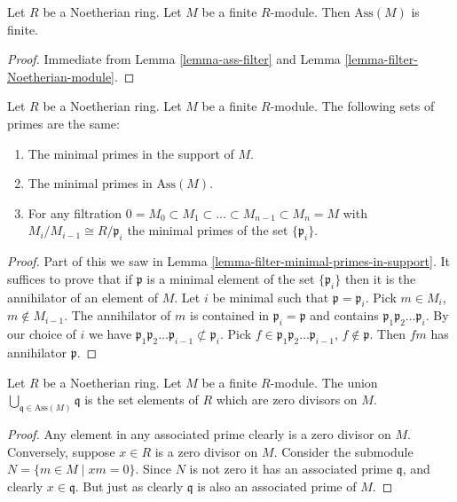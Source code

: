 \begin{lemma}
\label{lemma-finite-ass}
Let $R$ be a Noetherian ring.
Let $M$ be a finite $R$-module.
Then $\text{Ass}(M)$ is finite.
\end{lemma}

\begin{proof}
Immediate from Lemma \ref{lemma-ass-filter} and
Lemma \ref{lemma-filter-Noetherian-module}.
\end{proof}

\begin{proposition}
Let $R$ be a Noetherian ring.
Let $M$ be a finite $R$-module.
The following sets of primes are the same:
\begin{enumerate}
\item The minimal primes in the support of $M$.
\item The minimal primes in $\text{Ass}(M)$.
\item For any filtration $0 = M_0 \subset M_1 \subset \ldots
\subset M_{n-1} \subset M_n = M$ with $M_i/M_{i-1} \cong R/\mathfrak p_i$
the minimal primes of the set $\{\mathfrak p_i\}$.
\end{enumerate}
\end{proposition}

\begin{proof}
Part of this we saw in Lemma \ref{lemma-filter-minimal-primes-in-support}.
It suffices to prove that if $\mathfrak p$ is a minimal element of
the set $\{\mathfrak p_i\}$ then it is the annihilator of
an element of $M$. Let $i$ be minimal such that
$\mathfrak p = \mathfrak p_i$.
Pick $m \in M_i$, $m \not \in M_{i-1}$. The annihilator of $m$
is contained in $\mathfrak p_i = \mathfrak p$ and contains
$\mathfrak p_1 \mathfrak p_2 \ldots \mathfrak p_i$. By our choice of
$i$ we have $\mathfrak p_1 \mathfrak p_2 \ldots \mathfrak p_{i-1}
\not \subset \mathfrak p_i$. Pick
$f \in \mathfrak p_1 \mathfrak p_2 \ldots \mathfrak p_{i-1}$,
$f \not \in \mathfrak p$. Then $fm$ has annihilator $\mathfrak p$.
\end{proof}

\begin{lemma}
\label{lemma-ass-zero-divisors}
Let $R$ be a Noetherian ring.
Let $M$ be a finite $R$-module.
The union $\bigcup_{\mathfrak q \in \text{Ass}(M)} \mathfrak q$
is the set elements of $R$ which are zero divisors on $M$.
\end{lemma}

\begin{proof}
Any element in any associated prime clearly is a zero divisor
on $M$. Conversely, suppose $x \in R$ is a zero divisor on $M$.
Consider the submodule $N = \{m \in M \mid xm = 0\}$.
Since $N$ is not zero it has an associated prime $\mathfrak q$,
and clearly $x \in \mathfrak q$. But just as clearly $\mathfrak q$
is also an associated prime of $M$.
\end{proof}













